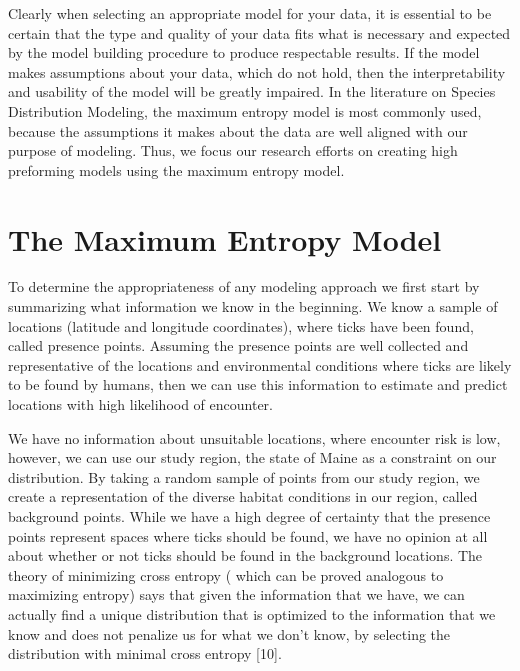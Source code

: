 \noindent Clearly when selecting an appropriate model for your data, it is essential to be certain that the type and quality of your data fits what is necessary and expected by the model building procedure to produce respectable results. If the model makes assumptions about your data, which do not hold, then the interpretability and usability of the model will be greatly impaired. In the literature on Species Distribution Modeling, the maximum entropy model is most commonly used, because the assumptions it makes about the data are well aligned with our purpose of modeling. Thus, we focus our research efforts on creating high preforming models using the maximum entropy model. \newline


\section{The Maximum Entropy Model}

To determine the appropriateness of any modeling approach we first start by summarizing what information we know in the beginning. We know a sample of locations (latitude and longitude coordinates), where ticks have been found, called presence points. Assuming the presence points are well collected and representative of the locations and environmental conditions where ticks are likely to be found by humans, then we can use this information to estimate and predict locations with high likelihood of encounter. \newline

\noindent We have no information about unsuitable locations, where encounter risk is low, however, we can use our study region, the state of Maine as a constraint on our distribution. By taking a random sample of points from our study region, we create a representation of the diverse habitat conditions in our region, called background points. While we have a high degree of certainty that the presence points represent spaces where ticks should be found, we have no opinion at all about whether or not ticks should be found in the background locations. The theory of minimizing cross entropy ( which can be proved analogous to maximizing entropy)  says that given the information that we have, we can actually find a unique distribution that is optimized to the information that we know and does not penalize us for what we don't know, by selecting the distribution with minimal cross entropy [10].\newline


